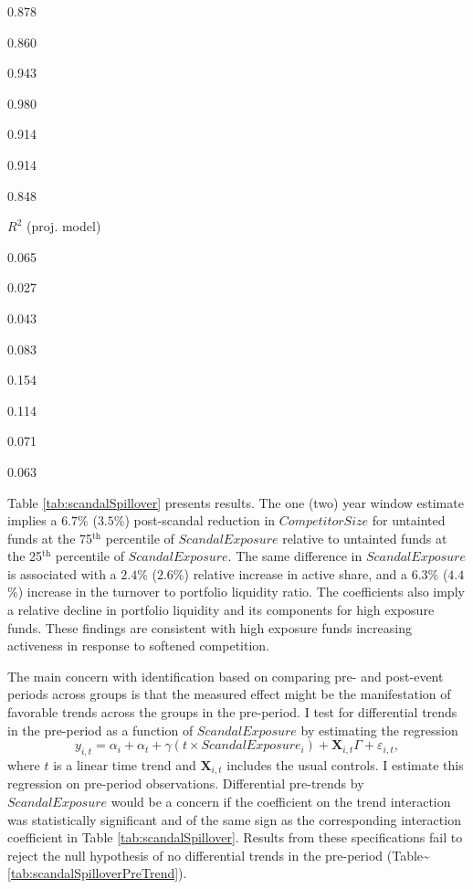 \documentclass[]{book}
\theoremstyle{definition}
\theoremstyle{definition}
\theoremstyle{definition}
\theoremstyle{remark}
\begin{document}
0.878

0.860

0.943

0.980

0.914

0.914

0.848

\(R^2\) (proj. model)

0.065

0.027

0.043

0.083

0.154

0.114

0.071

0.063

Table \ref{tab:scandalSpillover} presents results. The one (two) year
window estimate implies a \(6.7\)\% (\(3.5\)\%) post-scandal reduction
in \(CompetitorSize\) for untainted funds at the 75\(^{\text{th}}\)
percentile of \(ScandalExposure\) relative to untainted funds at the
25\(^{\text{th}}\) percentile of \(ScandalExposure\). The same
difference in \(ScandalExposure\) is associated with a \(2.4\)\%
(\(2.6\)\%) relative increase in active share, and a \(6.3\)\%
(\(4.4\)\%) increase in the turnover to portfolio liquidity ratio. The
coefficients also imply a relative decline in portfolio liquidity and
its components for high exposure funds. These findings are consistent
with high exposure funds increasing activeness in response to softened
competition.

The main concern with identification based on comparing pre- and
post-event periods across groups is that the measured effect might be
the manifestation of favorable trends across the groups in the
pre-period. I test for differential trends in the pre-period as a
function of \(ScandalExposure\) by estimating the regression
\begin{equation}
y_{i,t} = \alpha_i + \alpha_t + \gamma \left(t \times ScandalExposure_i\right) + \mathbf{X}_{i,t}\Gamma + \varepsilon_{i,t},
\end{equation} where \(t\) is a linear time trend and
\(\mathbf{X}_{i,t}\) includes the usual controls. I estimate this
regression on pre-period observations. Differential pre-trends by
\(ScandalExposure\) would be a concern if the coefficient on the trend
interaction was statistically significant and of the same sign as the
corresponding interaction coefficient in Table
\ref{tab:scandalSpillover}. Results from these specifications fail to
reject the null hypothesis of no differential trends in the pre-period
(Table\textasciitilde{}\ref{tab:scandalSpilloverPreTrend}).
\end{document}
